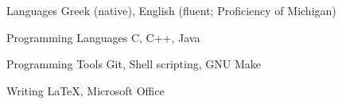 

\begin{cvskills}

  \cvskill
    {Languages} %
    {Greek (native), English (fluent; Proficiency of Michigan)} %

  \cvskill
    {Programming Languages} %
    {C, C++, Java} %

  \cvskill
    {Programming Tools} %
    {Git, Shell scripting, GNU Make} %

  \cvskill
    {Writing} %
    {LaTeX, Microsoft Office} %


\end{cvskills}
